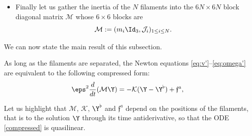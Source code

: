 \begin{itemize}
\begin{equation}
\begin{pmatrix}
T^a
\end{pmatrix},
\end{equation}
where
\begin{equation*}
F^a:= (F^a_i)_{1 \leq i \leq N} \quad \text{ and } \quad T^a := (T^a_i)_{1 \leq i \leq N},
\end{equation*}
with for $ 1 \leq i \leq N$,
\begin{gather*}
F^a_i := \int_{\partial \mathcal S_i } \Sigma(u^\flat, p^\flat) n \, d\mathcal{H}^2 \quad \text{
and } \quad T^a_i := \int_{\partial \mathcal S_i} (x - h_{i,\eps}) \wedge \Sigma(u^\flat, p^\flat) n \, d\mathcal{H}^2.
\end{gather*}
The choice of the index ``$a$'' is for Archimedes, because, as one proceeds in the usual computation of gravity buoyancy, see \cite[(4.18)]{Galdi2} or
\cite[p.\,105]{serre-japan},
one may use integration by parts inside the filaments to arrive at
\begin{gather}
\label{archim}
F^a_i
= \int_{\mathcal S_i } (\Delta u^\flat + \nabla p^\flat) \dd x
\quad \text{
and } \quad T^a_i
= \int_{\mathcal S_i } (x - h_{i,\eps}) \wedge (\Delta u^\flat + \nabla p^\flat) \dd x.
\end{gather}
\item Finally let us gather the inertia of the $N$ filaments into the $6N \times 6N$ block diagonal matrix $\mathcal{M}$ whose $6 \times 6$ blocks are
\begin{equation}
\label{domi}
\mathcal{M} := (m_i \Id_3, \mathcal{J}_i)_{1 \leq i \leq N}. \end{equation}
\end{itemize}
We can now state the main result of this subsection.
\begin{Proposition}\label{reformul}
As long as the filaments are separated,
the Newton equations \eqref{eq:v'}--\eqref{eq:omega'} are equivalent to the following compressed form:
\begin{equation}
\label{compressed}
\eps^2 \frac{d}{dt} (\mathcal{M} \Y)
=- \mathcal K (\Y - \Y^{\flat}) + \mathfrak{f}^a
,
\end{equation}
\end{Proposition}
Let us highlight that $\mathcal{M}$, $\mathcal K$, $\Y^\flat $ and $\mathfrak{f}^a$
depend on the positions of the filaments, that is to
the solution $\Y$ through its time antiderivative, so that the ODE \eqref{compressed} is quasilinear.

